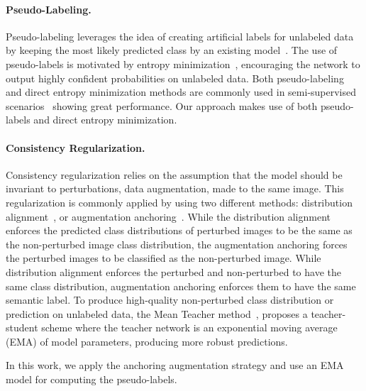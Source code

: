 \documentclass[10pt,twocolumn,letterpaper]{article}
\begin{document}
\paragraph{Pseudo-Labeling.}
Pseudo-labeling leverages the idea of creating artificial labels for unlabeled data~\cite{mclachlan1975iterative, scudder1965probability} by keeping the most likely predicted class by an existing model~\cite{lee2013pseudo}.
The use of pseudo-labels is motivated by entropy minimization~\cite{grandvalet2004semi}, encouraging the network to output highly confident probabilities on unlabeled data.
Both pseudo-labeling and direct entropy minimization methods are commonly used in semi-supervised scenarios~\cite{feng2020semiCBC, kalluri2019universal, sohn2020fixmatch, olsson2021classmix} showing great performance.
Our approach makes use of both pseudo-labels and direct entropy minimization.

\paragraph{Consistency Regularization.}
Consistency regularization relies on the assumption that the model should be invariant to perturbations, \eg data augmentation, made to the same image. This regularization is commonly applied by using two different methods: distribution alignment~\cite{berthelot2019mixmatch, sajjadi2016regularization, tarvainenweight}, or augmentation anchoring~\cite{sohn2020fixmatch}.
While the distribution alignment enforces the predicted class distributions of perturbed images to be the same as the non-perturbed image class distribution, the augmentation anchoring forces the perturbed images to be classified as the non-perturbed image.
While distribution alignment enforces the perturbed and non-perturbed to have the same class distribution, augmentation anchoring enforces them to have the same semantic label. 
To produce high-quality non-perturbed class distribution or prediction on unlabeled data, the Mean Teacher method~\cite{tarvainen2017mean}, proposes a teacher-student scheme where the teacher network is an exponential moving average (EMA) of model parameters, producing more robust predictions.

In this work, we apply the anchoring augmentation strategy and use an EMA model for computing the pseudo-labels.
\end{document}
